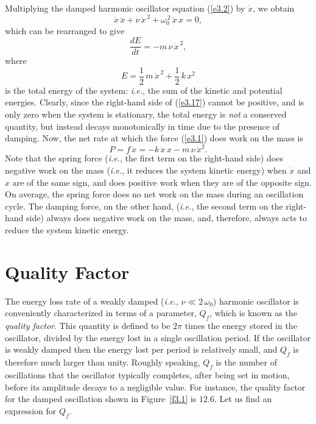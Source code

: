  Multiplying the damped harmonic oscillator equation (\ref{e3.2}) by $\dot{x}$,
 we obtain
 \begin{equation}
 \dot{x}\,\ddot{x} + \nu\,\dot{x}^{\,2}+ \omega_0^{\,2}\,\dot{x}\,x=0,
 \end{equation}
 which can be rearranged to give
 \begin{equation}\label{e3.17}
 \frac{dE}{dt} = - m\,\nu\,\dot{x}^{\,2},
 \end{equation}
 where
 \begin{equation}
 E = \frac{1}{2}\,m\,\dot{x}^{\,2}+\frac{1}{2}\,k\,x^2
 \end{equation}
 is the total energy of the system: {\em i.e.}, the sum of the kinetic and potential energies. Clearly, since the right-hand side of (\ref{e3.17})
 cannot be positive, and is only zero when the system is stationary, the
 total energy is {\em not}\/ a conserved quantity, but instead decays monotonically in time due to the presence of damping. Now, the net rate at which the force (\ref{e3.1}) does work
 on the mass is
 \begin{equation}
 P = f\,\dot{x} = -k\,\dot{x}\,x-m\,\nu\,\dot{x}^2.
 \end{equation}
 Note that the spring force ({\em i.e.}, the first term on the right-hand side) does negative work
 on the mass ({\em i.e.}, it reduces the system kinetic energy) when $\dot{x}$ and $x$ are of the same sign, and does positive work when they are of the opposite sign. On average,
 the spring force does no net work on the mass during an oscillation cycle. The
 damping force, on the other hand, ({\em i.e.}, the second term on the right-hand side)
 always does negative work on the mass, and, therefore, always acts to reduce the
 system kinetic energy. 
 
 \section{Quality Factor}
 The energy loss rate of a weakly damped  ({\em i.e.}, $\nu\ll 2\,\omega_0$)  harmonic oscillator is conveniently 
characterized in terms of a parameter, $Q_f$, which is known as the 
{\em quality factor}. This quantity is defined to be $2\pi$ times the
energy stored in the oscillator, divided by the energy lost in a single
 oscillation period. If the oscillator is weakly damped then
the energy lost per period is relatively small, and $Q_f$ is therefore
much larger than unity.  Roughly speaking, $Q_f$ is the number of oscillations
 that the oscillator typically completes, after being set in motion, before its
 amplitude decays to a negligible value. For instance, the quality factor for the
 damped oscillation shown in Figure~\ref{f3.1} is $12.6$.
 Let us find an expression for $Q_f$.

